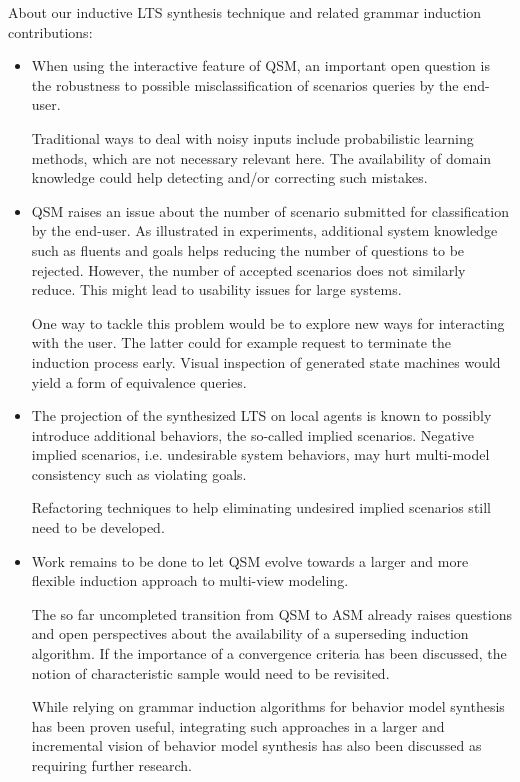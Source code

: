 About our inductive LTS synthesis technique and related grammar induction contributions:
\begin{itemize}

\item When using the interactive feature of QSM, an important open question is the robustness to possible misclassification of scenarios queries by the end-user. 

Traditional ways to deal with noisy inputs include probabilistic learning methods, which are not necessary relevant here. The availability of domain knowledge could help detecting and/or correcting such mistakes.

\item QSM raises an issue about the number of scenario submitted for classification by the end-user. As illustrated in experiments, additional system knowledge such as fluents and goals helps reducing the number of questions to be rejected. However, the number of accepted scenarios does not similarly reduce. This might lead to usability issues for large systems.

One way to tackle this problem would be to explore new ways for interacting with the user. The latter could for example request to terminate the induction process early. Visual inspection of generated state machines would yield a form of equivalence queries. 

\item The projection of the synthesized LTS on local agents is known to possibly introduce additional behaviors, the so-called implied scenarios. Negative implied scenarios, i.e. undesirable system behaviors, may hurt multi-model consistency such as violating goals. 

Refactoring techniques to help eliminating undesired implied scenarios still need to be developed.

\item Work remains to be done to let QSM evolve towards a larger and more flexible induction approach to multi-view modeling.

The so far uncompleted transition from QSM to ASM already raises questions and open perspectives about the availability of a superseding induction algorithm. If the importance of a convergence criteria has been discussed, the notion of characteristic sample would need to be revisited.

While relying on grammar induction algorithms for behavior model synthesis has been proven useful, integrating such approaches in a larger and incremental vision of behavior model synthesis has also been discussed as requiring further research.

\end{itemize}
